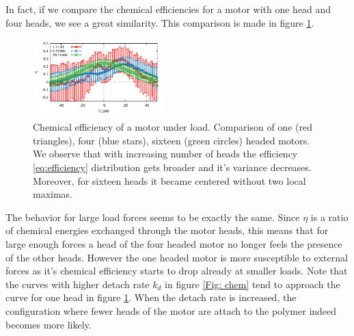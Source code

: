 \documentclass[aps,pre,twocolumn,showpacs,showkeys]{revtex4-1}
\begin{document}
In fact, if we compare the chemical efficiencies for a motor with one head and four heads, we see a great similarity.
This comparison is made in figure \ref{Fig: chem_eff_1head}.
\begin{figure}[t]
\centering
\includegraphics[width=0.45\textwidth,height=!]{chemical_cycle_1head}
\caption{Chemical efficiency of a motor under load. 
Comparison of one (red triangles), four (blue stars), sixteen (green circles) headed motors.
We observe that with increasing number of heads the efficiency \eqref{eq:efficiency} distribution 
gets broader and it's variance decreases.
Moreover, for sixteen heads it became centered without two local maximas. 
}
\label{Fig: chem_eff_1head}
\end{figure}
The behavior for large load forces seems to be exactly the same.
Since $\eta$ is a ratio of chemical energies exchanged through the motor heads, this means that for large enough forces a head of the four headed motor no longer feels the presence of the other heads.
However the one headed motor is more susceptible to external forces as it's chemical efficiency starts to drop already at smaller loads. 
Note that the curves with higher detach rate $k_d$ in figure \ref{Fig: chem} tend to approach the curve for one head in figure \ref{Fig: chem_eff_1head}. 
When the detach rate is increased, the configuration where fewer heads of the motor are attach to the polymer indeed becomes more likely.
\end{document}
